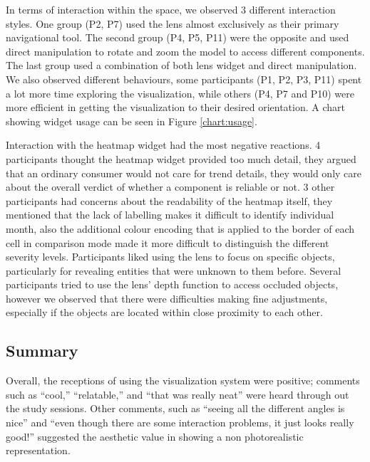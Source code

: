    
In terms of interaction within the \threed space, we observed 3 different
interaction styles. One group (P2, P7) used the lens almost exclusively
as their primary navigational tool. The second group (P4, P5, P11) were the
opposite and used direct manipulation to rotate and zoom the \threed model to
access different components. The last group used a combination of both lens
widget and direct manipulation. We also observed different behaviours, some
participants (P1, P2, P3, P11) spent a lot more time exploring the
visualization, while others (P4, P7 and P10) were more efficient in getting the
visualization to their desired orientation. A chart showing widget usage can be
seen in Figure \ref{chart:usage}.


Interaction with the heatmap widget had the most negative reactions. 4
participants thought the heatmap widget provided too much detail, they argued
that an ordinary consumer would not care for trend details, they would only care
about the overall verdict of whether a component is reliable or not. 3 other
participants had concerns about the readability of the heatmap itself, they
mentioned that the lack of labelling makes it difficult to identify individual
month, also the additional colour encoding that is applied to the border of each
cell in comparison mode made it more difficult to distinguish the different
severity levels. Participants liked using the lens to focus on specific
objects, particularly for revealing entities that were unknown to them
before. Several participants tried to use the lens' depth function to access
occluded objects, however we observed that there were difficulties making fine
adjustments, especially if the objects are located within close proximity to each other.
  
\subsection{Summary}
Overall, the receptions of using the visualization system were positive;
comments such as ``cool,'' ``relatable,'' and ``that was really neat'' were heard
through out the study sessions. Other comments, such as ``seeing all the different angles is
nice'' and ``even though there are some interaction problems, it just looks
really good!'' suggested the aesthetic value in showing a non photorealistic \threed
representation.  
  